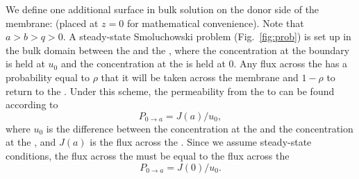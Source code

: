         \par We define one additional surface in bulk solution on the donor side of the membrane:  (placed at $z=0$ for mathematical convenience). Note that $a>b>q>0$. A steady-state Smoluchowski problem (Fig.~\ref{fig:prob}) is set up in the bulk domain between the  and the , where the concentration at the  boundary is held at $u_0$ and the concentration at the  is held at $0$. Any flux across the  has a probability equal to $\rho$ that it will be taken across the membrane and $1-\rho$ to return to the . Under this scheme, the permeability from the  to  can be found according to
        \begin{equation}
            P_{0\rightarrow a} = J(a)/u_0,
        \end{equation}
        where $u_0$ is the difference between the concentration at the  and the concentration at the , and $J(a)$ is the flux across the . Since we assume steady-state conditions, the flux across the  must be equal to the flux across the 
        \begin{equation}
            P_{0\rightarrow a} = J(0)/u_0.
        \end{equation}

